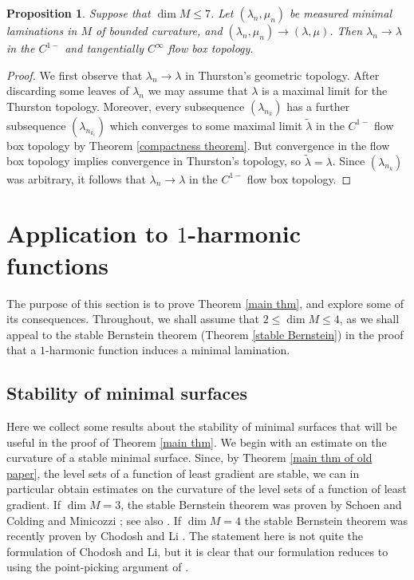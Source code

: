 \documentclass[reqno,11pt]{amsart}
\newtheorem{proposition}[theorem]{Proposition}
\theoremstyle{definition}
\numberwithin{equation}{section}
\begin{document}
\begin{proposition}
Suppose that $\dim M \leq 7$.
Let $(\lambda_n, \mu_n)$ be measured minimal laminations in $M$ of bounded curvature, and $(\lambda_n, \mu_n) \to (\lambda, \mu)$.
Then $\lambda_n \to \lambda$ in the $C^{1-}$ and tangentially $C^\infty$ flow box topology.
\end{proposition}
\begin{proof}
We first observe that $\lambda_n \to \lambda$ in Thurston's geometric topology.
After discarding some leaves of $\lambda_n$ we may assume that $\lambda$ is a maximal limit for the Thurston topology.
Moreover, every subsequence $(\lambda_{n_k})$ has a further subsequence $(\lambda_{n_{k_\ell}})$ which converges to some maximal limit $\tilde \lambda$ in the $C^{1-}$ flow box topology by Theorem \ref{compactness theorem}.
But convergence in the flow box topology implies convergence in Thurston's topology, so $\tilde \lambda = \lambda$.
Since $(\lambda_{n_k})$ was arbitrary, it follows that $\lambda_n \to \lambda$ in the $C^{1-}$ flow box topology.
\end{proof}


\section{Application to \texorpdfstring{$1$-harmonic}{one-harmonic} functions}\label{1harmonic sec}
The purpose of this section is to prove Theorem \ref{main thm}, and explore some of its consequences.
Throughout, we shall assume that $2 \leq \dim M \leq 4$, as we shall appeal to the stable Bernstein theorem (Theorem \ref{stable Bernstein}) in the proof that a $1$-harmonic function induces a minimal lamination.

\subsection{Stability of minimal surfaces}
Here we collect some results about the stability of minimal surfaces that will be useful in the proof of Theorem \ref{main thm}.
We begin with an estimate on the curvature of a stable minimal surface.
Since, by Theorem \ref{main thm of old paper}, the level sets of a function of least gradient are stable, we can in particular obtain estimates on the curvature of the level sets of a function of least gradient.
If $\dim M = 3$, the stable Bernstein theorem was proven by Schoen \cite{Schoen2016} and Colding and Minicozzi \cite{ColdingMinicozziParametric}; see also \cite[Theorem 2.10]{colding2011course}.
If $\dim M = 4$ the stable Bernstein theorem was recently proven by Chodosh and Li \cite{Chodosh2021}.
The statement here is not quite the formulation of Chodosh and Li, but it is clear that our formulation reduces to \cite[Theorem 1]{Chodosh2021} using the point-picking argument of \cite[\S5]{Chodosh2021}.
\end{document}
